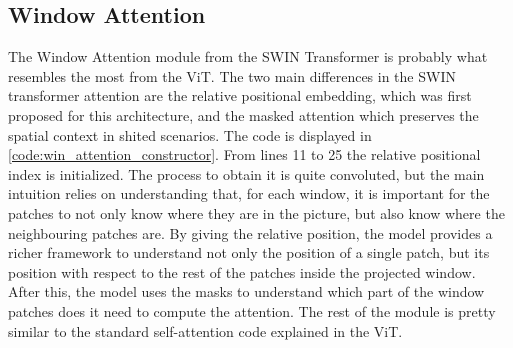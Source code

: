 \subsection{Window Attention}
\label{sec:window_attention}
The Window Attention module from the SWIN Transformer is probably what resembles the most from the ViT. The two main differences in the SWIN transformer attention are the relative positional embedding, which was first proposed for this architecture, and the masked attention which preserves the spatial context in shited scenarios. The code is displayed in \ref{code:win_attention_constructor}. From lines 11 to 25 the relative positional index is initialized. The process to obtain it is quite convoluted, but the main intuition relies on understanding that, for each window, it is important for the patches to not only know where they are in the picture, but also know where the neighbouring patches are. By giving the relative position, the model provides a richer framework to understand not only the position of a single patch, but its position with respect to the rest of the patches inside the projected window. After this, the model uses the masks to understand which part of the window patches does it need to compute the attention. The rest of the module is pretty similar to the standard self-attention code explained in the ViT.

